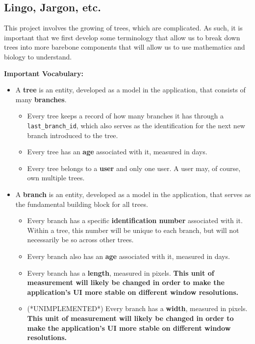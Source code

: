 \hypertarget{lingo}{\subsection{Lingo, Jargon, etc.}}

This project involves the growing of trees, which are complicated. As such, it is important that we first develop some terminology that allow us to break down trees into more barebone components that will allow us to use mathematics and biology to understand.

\textbf{Important Vocabulary:}
\begin{itemize}
    \item A \textbf{tree} is an entity, developed as a model in the application, that consists of many \textbf{branches}.
    \begin{itemize}
        \item Every tree keeps a record of how many branches it has through a \verb|last_branch_id|, which also serves as the identification for the next new branch introduced to the tree.

        \item Every tree has an \textbf{age} associated with it, measured in days.

        \item Every tree belongs to a \textbf{user} and only one user. A user may, of course, own multiple trees.
    \end{itemize}

    \item A \textbf{branch} is an entity, developed as a model in the application, that serves as the fundamental building block for all trees.

    \begin{itemize}
        \item Every branch has a specific \textbf{identification number} associated with it. Within a tree, this number will be unique to each branch, but will not necessarily be so across other trees.

        \item Every branch also has an \textbf{age} associated with it, measured in days.

        \item Every branch has a \textbf{length}, measured in pixels. \textbf{This unit of measurement will likely be changed in order to make the application's UI more stable on different window resolutions.}

        \item (*UNIMPLEMENTED*) Every branch has a \textbf{width}, measured in pixels. \textbf{This unit of measurement will likely be changed in order to make the application's UI more stable on different window resolutions.}


\end{itemize}
\end{itemize}
